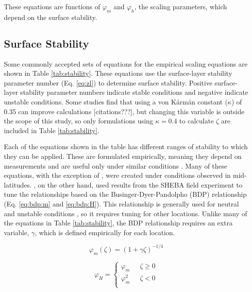 These equations are functions of $\varphi_{m}$ and $\varphi_{h}$, the scaling parameters, which depend on the surface stability. 

\subsection{Surface Stability}

Some commonly accepted sets of equations for the empirical scaling equations are shown in Table \ref{tab:stability}. These equations use the surface-layer stability parameter number (Eq. \ref{eq:zl}) to determine surface stability. Positive surface-layer stability parameter numbers indicate stable conditions and negative indicate unstable conditions. Some studies find that using a von K\'{a}rm\'{a}n constant ($\kappa$) of 0.35 can improve calculations [citations???], but changing this variable is outside the scope of this study, so only formulations using $\kappa = 0.4$ to calculate $\zeta$ are included in Table \ref{tab:stability}. 

Each of the equations shown in the table has different ranges of stability to which they can be applied. These are formulated empirically, meaning they depend on measurements and are useful only under similar conditions \citep{stull:1988} \citep{foken:2008}. Many of these equations, with the exception of \citet{andreas:2010}, were created under conditions observed in mid-latitudes. \citet{andreas:2010}, on the other hand, used results from the SHEBA field experiment to tune the relationships based on the Businger-Dyer-Pandolpho (BDP) relationship (Eq. \ref{eq:bdp:m} and \ref{eq:bdp:H}). This relationship is generally used for neutral and unstable conditions \citep{foken:2008}, so it requires tuning for other locations. Unlike many of the equations in Table \ref{tab:stability}, the BDP relationship requires an extra variable, $\gamma$, which is defined empirically for each location.

\begin{equation}\label{eq:bdp:m}
\varphi_{m}(\zeta) = (1 + \gamma \zeta)^{-1/4}
\end{equation}

\begin{equation}\label{eq:bdp:H}
\varphi_{H} = \begin{cases} 
\varphi_{m} & \text{    } \zeta \geq 0 \\ 
\varphi_{m}^{2} & \text{    } \zeta < 0 \\ 
\end{cases}
\end{equation}

